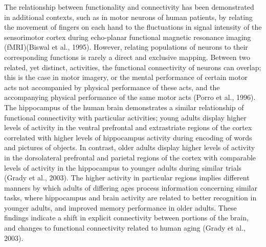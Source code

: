 \documentclass[11pt,titlepage]{article}
\begin{document}
The relationship between functionality and connectivity has been demonstrated in additional contexts, such as in motor neurons of human patients, by relating the movement of fingers on each hand to the fluctuations in signal intensity of the sensorimotor cortex during echo-planar functional magnetic resonance imaging (fMRI)(Biswal et al., 1995). However, relating populations of neurons to their corresponding functions is rarely a direct and exclusive mapping. Between two related, yet distinct, activities, the functional connectivity of neurons can overlap; this is the case in motor imagery, or the mental performance of certain motor acts not accompanied by physical performance of these acts, and the accompanying physical performance of the same motor acts (Porro et al., 1996). The hippocampus of the human brain demonstrates a similar relationship of functional connectivity with particular activities; young adults display higher levels of activity in the ventral prefrontal and extrastriate regions of the cortex correlated with higher levels of hippocampus activity during  encoding of words and pictures of objects. In contrast, older adults display higher levels of activity in the dorsolateral prefrontal and parietal regions of the cortex with comparable levels of activity in the hippocampus to younger adults during similar trials (Grady et al., 2003). The higher activity in particular regions implies different manners by which adults of differing ages process information concerning similar tasks, where hippocampus and brain activity are related to better recognition in younger adults, and improved memory performance in older adults. These findings indicate a shift in explicit connectivity between portions of the brain, and changes to functional connectivity related to human aging (Grady et al., 2003).\par
\end{document}
